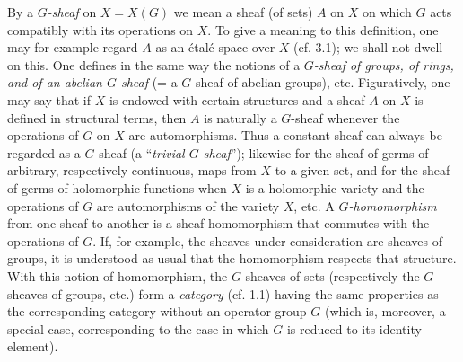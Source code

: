 By a \textit{$G$-sheaf} on $X=X(G)$ we mean a sheaf (of sets) $A$ on $X$ on
which $G$ acts compatibly with its operations on $X$. To give a meaning to
this definition, one may for example regard $A$ as an étalé space over $X$
(cf. 3.1); we shall not dwell on this. One defines in the same way the notions
of a \textit{$G$-sheaf of groups, of rings, and of an abelian
$G$-sheaf} (= a $G$-sheaf of abelian groups), etc.
Figuratively, one may say that if $X$ is endowed with certain structures and a
sheaf $A$ on $X$ is defined in structural terms, then $A$ is naturally a
$G$-sheaf whenever the operations of $G$ on $X$ are automorphisms. Thus a
constant sheaf can always be regarded as a $G$-sheaf (a ``\textit{trivial
$G$-sheaf}''); likewise for the sheaf of germs of arbitrary, respectively
continuous, maps from $X$ to a given set, and for the sheaf of germs of
holomorphic functions when $X$ is a holomorphic variety and the operations of
$G$ are automorphisms of the variety $X$, etc.
A \textit{$G$-homomorphism} from one sheaf to another is a sheaf homomorphism
that commutes with the operations of $G$. If, for example, the sheaves under
consideration are sheaves of groups, it is understood as usual that the
homomorphism respects that structure.
With this notion of homomorphism, the $G$-sheaves of sets (respectively the
$G$-sheaves of groups, etc.) form a \textit{category} (cf. 1.1) having the
same properties as the corresponding category without an operator group $G$
(which is, moreover, a special case, corresponding to the case in which $G$
is reduced to its identity element).

